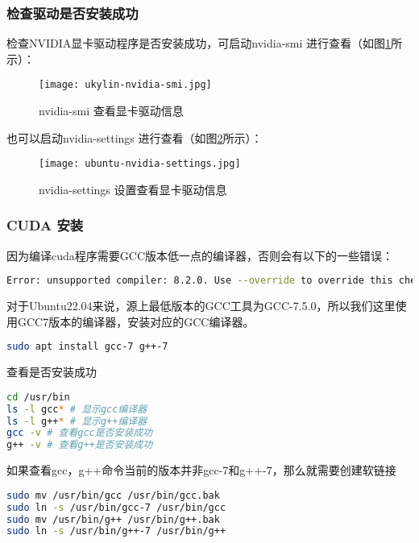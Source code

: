 \documentclass[lang=cn,a4paper,newtx]{elegantpaper}
\begin{document}
\subsubsection{检查驱动是否安装成功}
检查NVIDIA显卡驱动程序是否安装成功，可启动nvidia-smi 进行查看（如图\ref{fig:nvidia-smi-ukylin}所示）：

\begin{figure}[hbpt]
  \centering
  \texttt{[image: ukylin-nvidia-smi.jpg]}
  \caption{nvidia-smi 查看显卡驱动信息}
  \label{fig:nvidia-smi-ukylin}
\end{figure}

也可以启动nvidia-settings 进行查看（如图\ref{fig:ubuntu-nvidia-settings}所示）：

\begin{figure}[hbpt]
  \centering
  \texttt{[image: ubuntu-nvidia-settings.jpg]}
  \caption{nvidia-settings 设置查看显卡驱动信息}
  \label{fig:ubuntu-nvidia-settings}
\end{figure}

\subsubsection{CUDA 安装}
因为编译cuda程序需要GCC版本低一点的编译器，否则会有以下的一些错误：
\begin{lstlisting}[language=bash]
Error: unsupported compiler: 8.2.0. Use --override to override this check.
\end{lstlisting}

对于Ubuntu22.04来说，源上最低版本的GCC工具为GCC-7.5.0，所以我们这里使用GCC7版本的编译器，安装对应的GCC编译器。
\begin{lstlisting}[language=bash]
sudo apt install gcc-7 g++-7
\end{lstlisting}

查看是否安装成功
\begin{lstlisting}[language=bash]
cd /usr/bin
ls -l gcc* # 显示gcc编译器
ls -l g++* # 显示g++编译器
gcc -v # 查看gcc是否安装成功
g++ -v # 查看g++是否安装成功
\end{lstlisting}

如果查看gcc，g++命令当前的版本并非gcc-7和g++-7，那么就需要创建软链接
\begin{lstlisting}[language=bash]
sudo mv /usr/bin/gcc /usr/bin/gcc.bak
sudo ln -s /usr/bin/gcc-7 /usr/bin/gcc
sudo mv /usr/bin/g++ /usr/bin/g++.bak
sudo ln -s /usr/bin/g++-7 /usr/bin/g++
\end{lstlisting}
\end{document}
